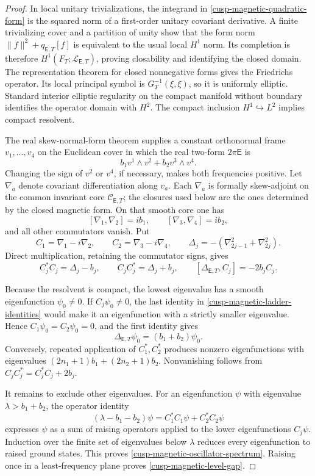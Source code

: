 \begin{proof}
In local unitary trivializations, the integrand in
\eqref{cusp-magnetic-quadratic-form} is the squared norm of a first-order
unitary covariant derivative.  A finite trivializing cover and a partition
of unity show that the form norm
\(\lVert f\rVert^2+q_{\mathsf E,T}[f]\) is equivalent to the usual local \(H^1\)
norm.  Its completion is therefore
\(H^1(F_T;\mathscr L_{\mathsf E,T})\), proving closability and identifying
the closed domain.  The representation theorem for closed nonnegative
forms gives the Friedrichs operator.  Its local principal symbol is
\(G_T^{-1}(\xi,\xi)\), so it is uniformly elliptic.  Standard interior
elliptic regularity on the compact manifold without boundary identifies
the operator domain with \(H^2\).  The compact inclusion
\(H^1\hookrightarrow L^2\) implies compact resolvent.

The real skew-normal-form theorem supplies a constant orthonormal frame
\(v_1,\ldots,v_4\) on the Euclidean cover in which the real two-form
\(2\pi\mathsf E\) is
\[
 b_1v^1\wedge v^2+b_2v^3\wedge v^4.
\]
Changing the sign of \(v^2\) or \(v^4\), if necessary, makes both
frequencies positive.  Let \(\nabla_a\) denote covariant differentiation
along \(v_a\).  Each \(\nabla_a\) is formally skew-adjoint on the common
invariant core \(\mathcal C_{\mathsf E,T}\); the closures used below are the
ones determined by the closed magnetic form.  On that smooth core one has
\[
 [\nabla_1,\nabla_2]=ib_1,
 \qquad
 [\nabla_3,\nabla_4]=ib_2,
\]
and all other commutators vanish.  Put
\[
 C_1=\nabla_1-i\nabla_2,
 \qquad
 C_2=\nabla_3-i\nabla_4,
 \qquad
 \Delta_j=-(\nabla_{2j-1}^2+\nabla_{2j}^2).
\]
Direct multiplication, retaining the commutator signs, gives
\begin{equation}
 C_j^*C_j=\Delta_j-b_j,
 \qquad
 C_jC_j^*=\Delta_j+b_j,
 \qquad
 [\Delta_{\mathsf E,T},C_j]=-2b_jC_j.
 \label{cusp-magnetic-ladder-identities}
\end{equation}

Because the resolvent is compact, the lowest eigenvalue has a smooth
eigenfunction \(\psi_0\neq0\).  If \(C_j\psi_0\neq0\), the last identity
in \eqref{cusp-magnetic-ladder-identities} would make it an eigenfunction
with a strictly smaller eigenvalue.  Hence \(C_1\psi_0=C_2\psi_0=0\), and
the first identity gives
\[
 \Delta_{\mathsf E,T}\psi_0=(b_1+b_2)\psi_0.
\]
Conversely, repeated application of \(C_1^*,C_2^*\) produces nonzero
eigenfunctions with eigenvalues
\((2n_1+1)b_1+(2n_2+1)b_2\).  Nonvanishing follows from
\(C_jC_j^*=C_j^*C_j+2b_j\).

It remains to exclude other eigenvalues.  For an eigenfunction \(\psi\)
with eigenvalue \(\lambda>b_1+b_2\), the operator identity
\[
 (\lambda-b_1-b_2)\psi
 =C_1^*C_1\psi+C_2^*C_2\psi
\]
expresses \(\psi\) as a sum of raising operators applied to the lower
eigenfunctions \(C_j\psi\).  Induction over the finite set of eigenvalues
below \(\lambda\) reduces every eigenfunction to raised ground states.
This proves \eqref{cusp-magnetic-oscillator-spectrum}.  Raising once in a
least-frequency plane proves \eqref{cusp-magnetic-level-gap}.
\end{proof}

